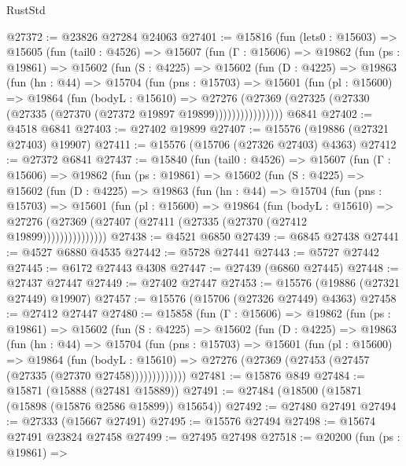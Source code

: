 \begin{lexlean}{RustStd}
\begin{coremodule}
@27372 := @23826 @27284 @24063
@27401 := @15816
    (fun (lets0 : @15603) =>
    @15605
      (fun (tail0 : @4526) =>
      @15607
        (fun (Γ : @15606) =>
        @19862
          (fun (ps : @19861) =>
          @15602
            (fun (S : @4225) =>
            @15602
              (fun (D : @4225) =>
              @19863
                (fun (hn : @44) =>
                @15704
                  (fun (pns : @15703) =>
                  @15601
                    (fun (pl : @15600) =>
                    @19864
                      (fun (bodyL : @15610) =>
                      @27276
                        (@27369
                          (@27325 (@27330 (@27335 (@27370 (@27372 @19897 @19899))))))))))))))))
    @6841
@27402 := @4518 @6841
@27403 := @27402 @19899
@27407 := @15576 (@19886 (@27321 @27403) @19907)
@27411 := @15576 (@15706 (@27326 @27403) @4363)
@27412 := @27372 @6841
@27437 := @15840
    (fun (tail0 : @4526) =>
    @15607
      (fun (Γ : @15606) =>
      @19862
        (fun (ps : @19861) =>
        @15602
          (fun (S : @4225) =>
          @15602
            (fun (D : @4225) =>
            @19863
              (fun (hn : @44) =>
              @15704
                (fun (pns : @15703) =>
                @15601
                  (fun (pl : @15600) =>
                  @19864
                    (fun (bodyL : @15610) =>
                    @27276 (@27369 (@27407 (@27411 (@27335 (@27370 (@27412 @19899)))))))))))))))
@27438 := @4521 @6850
@27439 := @6845 @27438
@27441 := @4527 @6880 @4535
@27442 := @5728 @27441
@27443 := @5727 @27442
@27445 := @6172 @27443 @4308
@27447 := @27439 (@6860 @27445)
@27448 := @27437 @27447
@27449 := @27402 @27447
@27453 := @15576 (@19886 (@27321 @27449) @19907)
@27457 := @15576 (@15706 (@27326 @27449) @4363)
@27458 := @27412 @27447
@27480 := @15858
    (fun (Γ : @15606) =>
    @19862
      (fun (ps : @19861) =>
      @15602
        (fun (S : @4225) =>
        @15602
          (fun (D : @4225) =>
          @19863
            (fun (hn : @44) =>
            @15704
              (fun (pns : @15703) =>
              @15601
                (fun (pl : @15600) =>
                @19864
                  (fun (bodyL : @15610) =>
                  @27276 (@27369 (@27453 (@27457 (@27335 (@27370 @27458)))))))))))))
@27481 := @15876 @849
@27484 := @15871 (@15888 (@27481 @15889))
@27491 := @27484 (@18500 (@15871 (@15898 (@15876 @2586 @15899)) @15654))
@27492 := @27480 @27491
@27494 := @27333 (@15667 @27491)
@27495 := @15576 @27494
@27498 := @15674 @27491 @23824 @27458
@27499 := @27495 @27498
@27518 := @20200
    (fun (ps : @19861) =>

\end{coremodule}
\end{lexlean}
